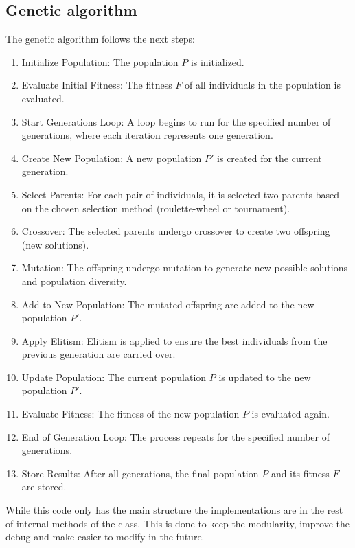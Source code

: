 \documentclass[11pt, a4paper]{article}
\begin{document}
\subsection{Genetic algorithm}

The genetic algorithm follows the next steps:

\begin{enumerate}
    \item Initialize Population: The population \(P\) is initialized.
    \item Evaluate Initial Fitness: The fitness \(F\) of all individuals in the population is evaluated.
    \item Start Generations Loop: A loop begins to run for the specified number of generations, where each iteration represents one generation.
    \item Create New Population: A new population \(P'\) is created for the current generation.
    \item Select Parents: For each pair of individuals, it is selected two parents based on the chosen selection method (roulette-wheel or tournament).
    \item Crossover: The selected parents undergo crossover to create two offspring (new solutions).
    \item Mutation: The offspring undergo mutation to generate new possible solutions and population diversity.
    \item Add to New Population: The mutated offspring are added to the new population \(P'\).
    \item Apply Elitism: Elitism is applied to ensure the best individuals from the previous generation are carried over.
    \item Update Population: The current population \(P\) is updated to the new population \(P'\).
    \item Evaluate Fitness: The fitness of the new population \(P\) is evaluated again.
    \item End of Generation Loop: The process repeats for the specified number of generations.
    \item Store Results: After all generations, the final population \(P\) and its fitness \(F\) are stored.
\end{enumerate}

While this code only has the main structure the implementations are in the rest of internal methods of the class. This is done to keep the modularity,
improve the debug and make easier to modify in the future.
\end{document}
